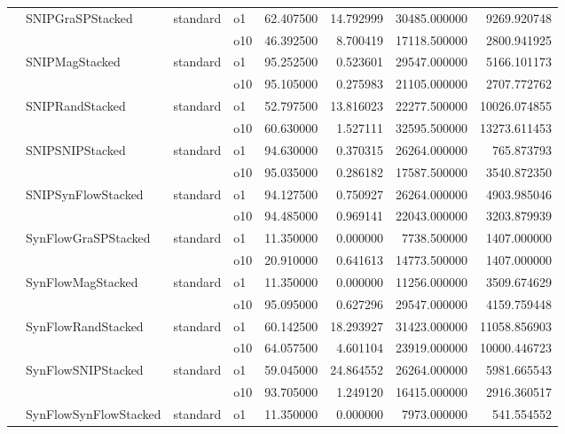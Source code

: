 \begin{longtable}{llllrrrr}
      & SNIPGraSPStacked & standard & o1 &  62.407500 &  14.792999 &     30485.000000 &   9269.920748 \\
      &     &         & o10 &  46.392500 &   8.700419 &     17118.500000 &   2800.941925 \\
      & SNIPMagStacked & standard & o1 &  95.252500 &   0.523601 &     29547.000000 &   5166.101173 \\
      &     &         & o10 &  95.105000 &   0.275983 &     21105.000000 &   2707.772762 \\
      & SNIPRandStacked & standard & o1 &  52.797500 &  13.816023 &     22277.500000 &  10026.074855 \\
      &     &         & o10 &  60.630000 &   1.527111 &     32595.500000 &  13273.611453 \\
      & SNIPSNIPStacked & standard & o1 &  94.630000 &   0.370315 &     26264.000000 &    765.873793 \\
      &     &         & o10 &  95.035000 &   0.286182 &     17587.500000 &   3540.872350 \\
      & SNIPSynFlowStacked & standard & o1 &  94.127500 &   0.750927 &     26264.000000 &   4903.985046 \\
      &     &         & o10 &  94.485000 &   0.969141 &     22043.000000 &   3203.879939 \\
      & SynFlowGraSPStacked & standard & o1 &  11.350000 &   0.000000 &      7738.500000 &   1407.000000 \\
      &     &         & o10 &  20.910000 &   0.641613 &     14773.500000 &   1407.000000 \\
      & SynFlowMagStacked & standard & o1 &  11.350000 &   0.000000 &     11256.000000 &   3509.674629 \\
      &     &         & o10 &  95.095000 &   0.627296 &     29547.000000 &   4159.759448 \\
      & SynFlowRandStacked & standard & o1 &  60.142500 &  18.293927 &     31423.000000 &  11058.856903 \\
      &     &         & o10 &  64.057500 &   4.601104 &     23919.000000 &  10000.446723 \\
      & SynFlowSNIPStacked & standard & o1 &  59.045000 &  24.864552 &     26264.000000 &   5981.665543 \\
      &     &         & o10 &  93.705000 &   1.249120 &     16415.000000 &   2916.360517 \\
      & SynFlowSynFlowStacked & standard & o1 &  11.350000 &   0.000000 &      7973.000000 &    541.554552 \\

\end{longtable}
